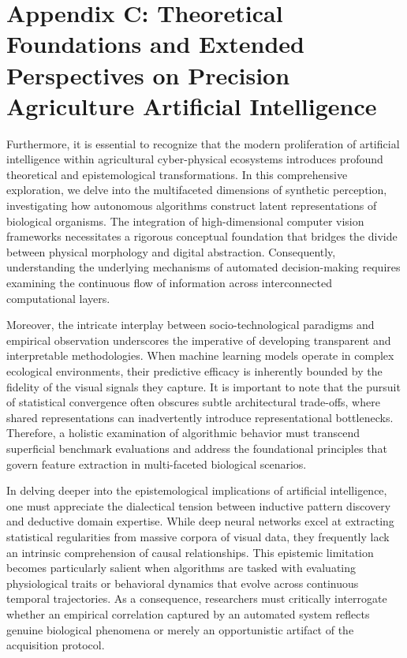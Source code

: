 \documentclass[Times,12pt,oneside,openany,print,index]{report}
\begin{document}
\setcounter{page}{67}
\chapter*{Appendix C: Theoretical Foundations and Extended Perspectives on Precision Agriculture Artificial Intelligence}

Furthermore, it is essential to recognize that the modern proliferation of artificial intelligence within agricultural cyber-physical ecosystems introduces profound theoretical and epistemological transformations. In this comprehensive exploration, we delve into the multifaceted dimensions of synthetic perception, investigating how autonomous algorithms construct latent representations of biological organisms. The integration of high-dimensional computer vision frameworks necessitates a rigorous conceptual foundation that bridges the divide between physical morphology and digital abstraction. Consequently, understanding the underlying mechanisms of automated decision-making requires examining the continuous flow of information across interconnected computational layers.

Moreover, the intricate interplay between socio-technological paradigms and empirical observation underscores the imperative of developing transparent and interpretable methodologies. When machine learning models operate in complex ecological environments, their predictive efficacy is inherently bounded by the fidelity of the visual signals they capture. It is important to note that the pursuit of statistical convergence often obscures subtle architectural trade-offs, where shared representations can inadvertently introduce representational bottlenecks. Therefore, a holistic examination of algorithmic behavior must transcend superficial benchmark evaluations and address the foundational principles that govern feature extraction in multi-faceted biological scenarios.

In delving deeper into the epistemological implications of artificial intelligence, one must appreciate the dialectical tension between inductive pattern discovery and deductive domain expertise. While deep neural networks excel at extracting statistical regularities from massive corpora of visual data, they frequently lack an intrinsic comprehension of causal relationships. This epistemic limitation becomes particularly salient when algorithms are tasked with evaluating physiological traits or behavioral dynamics that evolve across continuous temporal trajectories. As a consequence, researchers must critically interrogate whether an empirical correlation captured by an automated system reflects genuine biological phenomena or merely an opportunistic artifact of the acquisition protocol.
\end{document}
